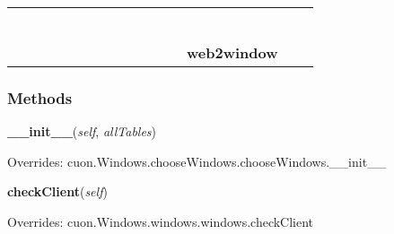 \begin{tabular}{cccccccccccccccc}
&&\multicolumn{1}{|c}{}
&&
&&
  \\\cline{9-9}
  &&&&&&&&\multicolumn{1}{c|}{}
&\multicolumn{1}{|c}{}&
&&
&&
  \\
\multicolumn{10}{r}{\settowidth{\BCL}{cuon.Windows.windows.windows}\multirow{2}{\BCL}{cuon.Windows.windows.windows}}
&&
&&
  \\\cline{11-11}
  &&&&&&&&&&\multicolumn{1}{c|}{}
&&
&&
  \\
\multicolumn{12}{r}{\settowidth{\BCL}{cuon.Windows.chooseWindows.chooseWindows}\multirow{2}{\BCL}{cuon.Windows.chooseWindows.chooseWindows}}
&&
  \\\cline{13-13}
  &&&&&&&&&&&&\multicolumn{1}{c|}{}
&&
  \\
&&&&&&&&&&&&\multicolumn{2}{l}{\textbf{web2window}}
\end{tabular}



  \subsubsection{Methods}

    \label{cuon:Web2:web2:web2window:__init__}
    \vspace{0.5ex}

    \begin{boxedminipage}{\textwidth}

    \raggedright \textbf{\_\_init\_\_}(\textit{self}, \textit{allTables})

      Overrides: cuon.Windows.chooseWindows.chooseWindows.\_\_init\_\_

    \end{boxedminipage}

    \label{cuon:Web2:web2:web2window:checkClient}
    \vspace{0.5ex}

    \begin{boxedminipage}{\textwidth}

    \raggedright \textbf{checkClient}(\textit{self})

      Overrides: cuon.Windows.windows.windows.checkClient

    \end{boxedminipage}

